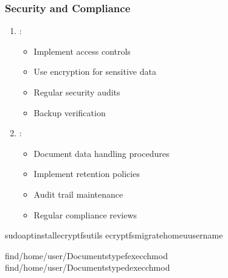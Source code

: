 \documentclass[letterpaper,10pt,english]{sphinxmanual}
\begin{document}
\subsubsection{Security and Compliance}
\label{\detokenize{data-organization:security-and-compliance}}\begin{enumerate}
%
\item {} 
\sphinxAtStartPar
{}:
\begin{itemize}
\item {} 
\sphinxAtStartPar
Implement access controls

\item {} 
\sphinxAtStartPar
Use encryption for sensitive data

\item {} 
\sphinxAtStartPar
Regular security audits

\item {} 
\sphinxAtStartPar
Backup verification

\end{itemize}

\item {} 
\sphinxAtStartPar
{}:
\begin{itemize}
\item {} 
\sphinxAtStartPar
Document data handling procedures

\item {} 
\sphinxAtStartPar
Implement retention policies

\item {} 
\sphinxAtStartPar
Audit trail maintenance

\item {} 
\sphinxAtStartPar
Regular compliance reviews

\end{itemize}

\end{enumerate}

\begin{sphinxVerbatim}[commandchars=\\\{\}]
sudoaptinstallecryptfs\PYGZhy{}utils
ecryptfs\PYGZhy{}migrate\PYGZhy{}home\PYGZhy{}uusername

find/home/user/Documents\PYGZhy{}typef\PYGZhy{}execchmod
find/home/user/Documents\PYGZhy{}typed\PYGZhy{}execchmod
\end{sphinxVerbatim}
\end{document}
